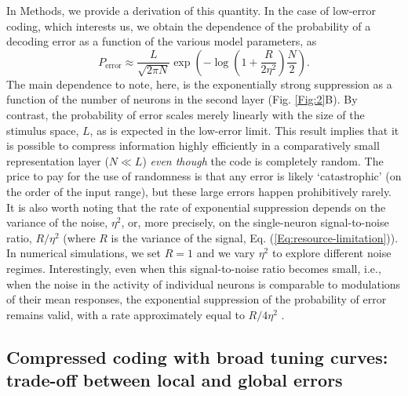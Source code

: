 \documentclass[a4paper]{article}%
\begin{document}
In Methods, we provide a derivation of this quantity. In the case of low-error
coding, which interests us, we obtain the dependence of the probability of a
decoding error as a function of the various model parameters, as
\begin{equation}
P_{\text{error}}\approx\frac{L}{\sqrt{2\pi N}}\exp\left(  -{\log}\left(
{1+\frac{R}{2\eta^{2}}}\right)  {\frac{N}{2}}\right)  . \label{Eq:PGE}%
\end{equation}
The main dependence to note, here, is the exponentially strong suppression as
a function of the number of neurons in the second layer (Fig. \ref{Fig:2}B).
By contrast, the probability of error scales merely linearly with the size of
the stimulus space, $L$, as is expected in the low-error limit. This result
implies that it is possible to compress information highly efficiently in a
comparatively small representation layer ($N\ll L$) \textit{even though} the
code is completely random. The price to pay for the use of randomness is that
any error is likely `catastrophic' (on the order of the input range), but these large
errors happen prohibitively rarely. It is also worth noting that the rate of
exponential suppression depends on the variance of the noise, $\eta^{2}$, or,
more precisely, on the single-neuron signal-to-noise ratio, $R/\eta^{2}$
(where $R$ is the variance of the signal, Eq. (\ref{Eq:resource-limitation})).
In numerical simulations, we set $R=1$ and we vary $\eta^{2}$ to explore
different noise regimes. Interestingly, even when this signal-to-noise ratio
becomes small, i.e., when the noise in the activity of individual neurons is
comparable to modulations of their mean responses, the exponential suppression
of the probability of error remains valid, with a rate approximately equal to
$R/4\eta^{2}$ .



\subsection*{Compressed coding with broad tuning curves: trade-off between
local and global errors}
\end{document}
